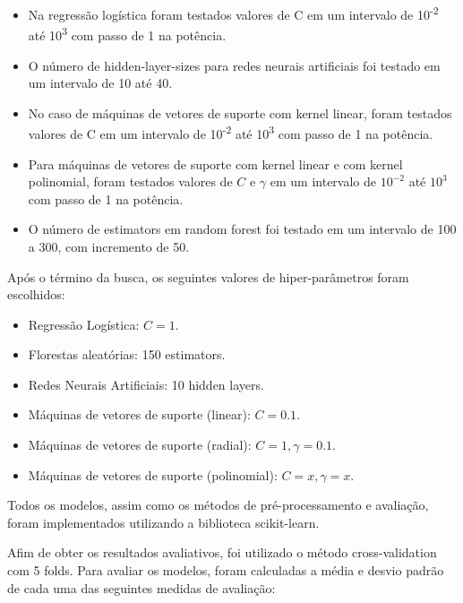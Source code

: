 \documentclass[10pt, conference, compsocconf]{IEEEtran}
\begin{document}
\begin{itemize}
        \item Na regressão logística foram testados valores de C em um intervalo de 10\textsuperscript{-2} até 10\textsuperscript{3} com passo de 1 na potência.
        \item O número de hidden-layer-sizes para redes neurais artificiais foi testado em um intervalo de 10 até 40.
        \item No caso de máquinas de vetores de suporte com kernel linear, foram testados valores de C em um intervalo de 10\textsuperscript{-2} até 10\textsuperscript{3} com passo de 1 na potência.
        \item Para máquinas de vetores de suporte com kernel linear e com kernel polinomial, foram testados valores de \( C \) e \( \gamma \) em um intervalo de \( 10^{-2} \) até \( 10^{3} \) com passo de 1 na potência.

        \item O número de estimators em random forest foi testado em um intervalo de 100 a 300, com incremento de 50.
\end{itemize}

\vspace{0.3cm}
Após o término da busca, os seguintes valores de hiper-parâmetros foram escolhidos:

\vspace{0.3cm}
\begin{itemize}
    \item Regressão Logística: \( C = 1 \).
    \item Florestas aleatórias: 150 estimators.
    \item Redes Neurais Artificiais: 10 hidden layers.
    \item Máquinas de vetores de suporte (linear): \( C = 0.1 \).
    \item Máquinas de vetores de suporte (radial): \( C = 1, 
    \gamma = 0.1 \).
    \item Máquinas de vetores de suporte (polinomial): \( C = x, 
    \gamma = x \).
\end{itemize}

\vspace{0.3cm}

Todos os modelos, assim como os métodos de pré-processamento e avaliação, foram implementados utilizando a biblioteca scikit-learn.

Afim de obter os resultados avaliativos, foi utilizado o método cross-validation com 5 folds. Para avaliar os modelos, foram calculadas a média e desvio padrão de cada uma das seguintes medidas de avaliação:
\end{document}
